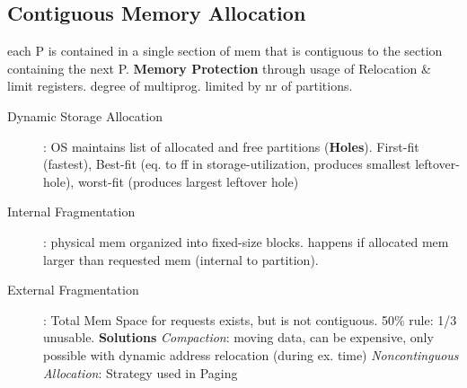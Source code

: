 \subsection*{Contiguous Memory Allocation}
each P is contained in a single section of mem that is contiguous to the section containing the next P. \textbf{Memory Protection} through usage of Relocation \& limit registers. degree of multiprog. limited by nr of partitions.
\begin{description}
    \item[Dynamic Storage Allocation]: OS maintains list of allocated and free partitions (\textbf{Holes}). First-fit (fastest), Best-fit (eq. to ff in storage-utilization, produces smallest leftover-hole), worst-fit (produces largest leftover hole) \\
    \item[Internal Fragmentation]: physical mem organized into fixed-size blocks. happens if allocated mem larger than requested mem (internal to partition). \\
    \item[External Fragmentation]: Total Mem Space for requests exists, but is not contiguous. 50\% rule: 1/3 unusable. \textbf{Solutions} \textit{Compaction}: moving data, can be expensive, only possible with dynamic address relocation (during ex. time) \textit{Noncontinguous Allocation}: Strategy used in Paging \\
\end{description}

